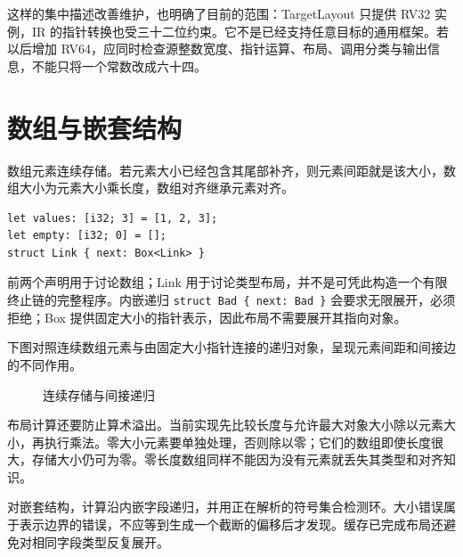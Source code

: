 这样的集中描述改善维护，也明确了目前的范围：TargetLayout 只提供 RV32 实例，IR 的指针转换也受三十二位约束。它不是已经支持任意目标的通用框架。若以后增加 RV64，应同时检查源整数宽度、指针运算、布局、调用分类与输出信息，不能只将一个常数改成六十四。

\section{数组与嵌套结构}
数组元素连续存储。若元素大小已经包含其尾部补齐，则元素间距就是该大小，数组大小为元素大小乘长度，数组对齐继承元素对齐。
\begin{lstlisting}[language=Rustless,caption={数组、零长度数组与间接递归}]
let values: [i32; 3] = [1, 2, 3];
let empty: [i32; 0] = [];
struct Link { next: Box<Link> }
\end{lstlisting}
前两个声明用于讨论数组；Link 用于讨论类型布局，并不是可凭此构造一个有限终止链的完整程序。内嵌递归 \texttt{struct Bad \{ next: Bad \}} 会要求无限展开，必须拒绝；Box 提供固定大小的指针表示，因此布局不需要展开其指向对象。

下图对照连续数组元素与由固定大小指针连接的递归对象，呈现元素间距和间接边的不同作用。
\begin{figure}[htbp]\centering
{}
\caption{连续存储与间接递归}
\end{figure}

布局计算还要防止算术溢出。当前实现先比较长度与允许最大对象大小除以元素大小，再执行乘法。零大小元素要单独处理，否则除以零；它们的数组即使长度很大，存储大小仍可为零。零长度数组同样不能因为没有元素就丢失其类型和对齐知识。

对嵌套结构，计算沿内嵌字段递归，并用正在解析的符号集合检测环。大小错误属于表示边界的错误，不应等到生成一个截断的偏移后才发现。缓存已完成布局还避免对相同字段类型反复展开。

